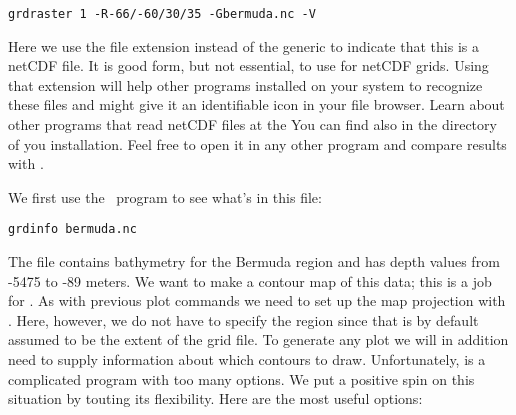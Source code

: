 \documentclass[11pt]{report}
\begin{document}
{\small\begin{verbatim}
grdraster 1 -R-66/-60/30/35 -Gbermuda.nc -V
\end{verbatim}
}

Here we use the file extension  instead of the generic 
to indicate that this is a netCDF file. It is good form, but not essential,
to use  for netCDF grids. Using that extension will help
other programs installed on your system to recognize these files and might
give it an identifiable icon in your file browser.
Learn about other programs that read netCDF files at the
You can find  also in the  directory of you \GMT{}
installation.  Feel free to open it in any other program and compare results with \GMT.

We first use the \GMT\ program  to see what's in this file:

{\small\begin{verbatim} 
grdinfo bermuda.nc
\end{verbatim}
}

The file contains bathymetry for the Bermuda region and has depth
values from -5475 to -89 meters.  We want to make a contour map of
this data; this is a job for .  As with previous
plot commands we need to set up the map projection with .
Here, however, we do not have to specify the region since that is by
default assumed to be the extent of the grid file.
To generate any plot we will in addition need to supply information
about which contours to draw.  Unfortunately, 
is a complicated program with too many options.  We put a positive
spin on this situation by touting its flexibility.  Here are the most
useful options:
\end{document}
